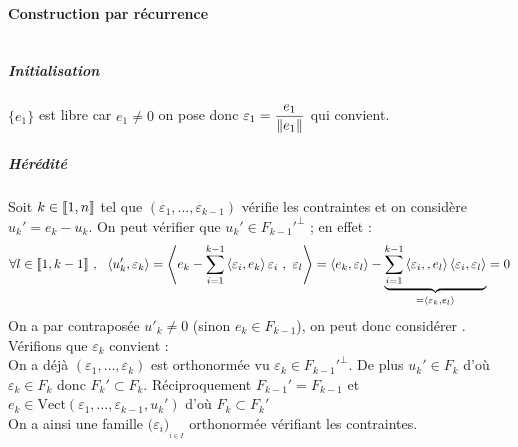 	\paragraph{Construction par récurrence} ${}$ \\
		\subparagraph{Initialisation}
			$\{e_1\}$ est libre car $e_1\neq 0$ on pose donc $\varepsilon_1 = \dfrac{e_1}{\left\Vert e_1 \right\Vert}$ qui convient.\\
		\subparagraph{Hérédité}
			Soit $k\in{\llbracket 1,n \rrbracket}$ tel que $(\varepsilon_1 , \dots ,\varepsilon_{k-1})$ vérifie les contraintes et on considère $u_k' = e_k-u_k$. 
			On peut vérifier que $u_k' \in F_{k-1}'^\perp$ ; en effet : \\
			\[\forall l\in {\llbracket 1,k-1 \rrbracket}~,~~\left< u_k',\varepsilon_k \right> = \left< e_k-\sum_{i= 1 }^{k-1} \left< \varepsilon_i,e_k \right>\varepsilon_i ~,~\varepsilon_l  \right> = \left< e_k,\varepsilon_l \right> - \underbrace{\sum_{i= 1 }^{k-1} \left< \varepsilon_i,,e_l \right>\left< \varepsilon_i,\varepsilon_l \right> }_{=\left< \varepsilon_k,e_l \right>} = 0\]
			On a par contraposée $u'_k\neq 0$ (sinon $e_k\in F_{k-1}$), on peut donc considérer . \\ Vérifions que $\varepsilon_k$ convient : \\
			On a déjà $(\varepsilon_1,\dots ,\varepsilon_k)$ est orthonormée vu $\varepsilon_k \in F_{k-1}'^\perp$. De plus $u_k'\in F_k$ d'où $\varepsilon_k\in F_k$ donc $F_k'\subset F_k$. Réciproquement $F_{k-1}'=F_{k-1}$ et $e_k\in \mathrm{Vect}(\varepsilon_1,\dots ,\varepsilon_{k-1}, u_k')$ d'où $F_k\subset F_k'$\\
			${}$ \\ On a ainsi une famille $\big( \varepsilon_i\big) _{_{i\in I}}$ orthonormée vérifiant les contraintes.
